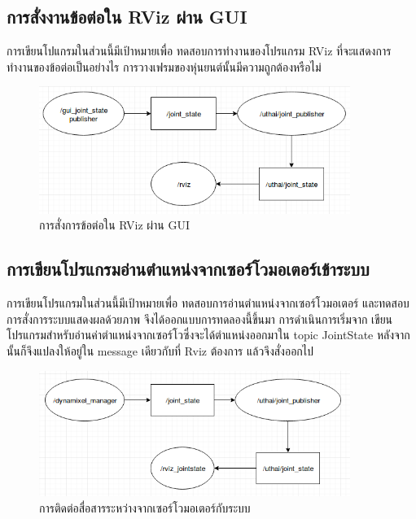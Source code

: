 \subsection{การสั่งงานข้อต่อใน RViz ผ่าน GUI}
การเขียนโปแกรมในส่วนนี้มีเป้าหมายเพื่อ ทดสอบการทำงานของโปรแกรม RViz ที่จะแสดงการทำงานของข้อต่อเป็นอย่างไร
การวางเฟรมของหุ่นยนต์นั้นมีความถูกต้องหรือไม่
\begin{figure}[!ht]
	\centering
	\includegraphics[width=0.9\textwidth]{chapter3/images/uthai_joint_gui.png}
	\caption{การสั่งการข้อต่อใน RViz ผ่าน GUI}
\end{figure}



\clearpage
\subsection{การเขียนโปรแกรมอ่านตำแหน่งจากเซอร์โวมอเตอร์เข้าระบบ}
การเขียนโปรแกรมในส่วนนี้มีเป้าหมายเพื่อ ทดสอบการอ่านตำแหน่งจากเซอร์โวมอเตอร์
และทดสอบการสั่งการระบบแสดงผลด้วยภาพ จึงได้ออกแบบการทดลองนี้ขึ้นมา
การดำเนินการเริ่มจาก เขียนโปรแกรมสำหรับอ่านค่าตำแหน่งจากเซอร์โวซึ่งจะได้ตำแหน่งออกมาใน topic
JointState หลังจากนั้นก็จึงแปลงให้อยู่ใน message เดียวกับที่ Rviz ต้องการ แล้วจึงสั่งออกไป
\begin{figure}[!ht]
	\centering
	\includegraphics[width=0.9\textwidth]{chapter3/images/rviz_joint_state.png}
	\caption{การติดต่อสื่อสารระหว่างจากเซอร์โวมอเตอร์กับระบบ}
\end{figure}

